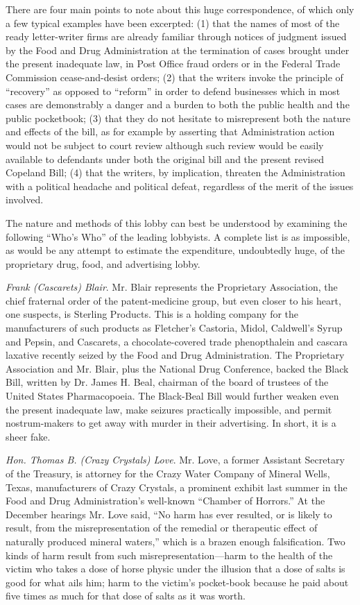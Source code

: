 \documentclass[openany,nobib]{tufte-book}
\begin{document}
There are four main points to note about this huge correspondence, of
which only a few typical examples have been excerpted: (1) that the
names of most of the ready letter-writer firms are already familiar
through notices of judgment issued by the Food and Drug Administration
at the termination of cases brought under the present inadequate law, in
Post Office fraud orders or in the Federal Trade Commission
cease-and-desist orders; (2) that the writers invoke the principle of
``recovery'' as opposed to ``reform'' in order to defend businesses
which in most cases are demonstrably a danger and a burden to both the
public health and the public pocketbook; (3) that they do not hesitate
to misrepresent both the nature and effects of the bill, as for example
by asserting that Administration action would not be subject to court
review although such review would be easily available to defendants
under both the original bill and the present revised Copeland Bill; (4)
that the writers, by implication, threaten the Administration with a
political headache and political defeat, regardless of the merit of the
issues involved.

The nature and methods of this lobby can best be understood by examining
the following ``Who's Who'' of the leading lobbyists. A complete list is
as impossible, as would be any attempt to estimate the expenditure,
undoubtedly huge, of the proprietary drug, food, and advertising lobby.

\emph{Frank (Cascarets) Blair}. Mr. Blair represents the Proprietary
Association, the chief fraternal order of the patent-medicine group, but
even closer to his heart, one suspects, is Sterling Products. This is a
holding company for the manufacturers of such products as Fletcher's
Castoria, Midol, Caldwell's Syrup and Pepsin, and Cascarets, a
chocolate-covered trade phenopthalein and cascara laxative recently
seized by the Food and Drug Administration. The Proprietary Association
and Mr. Blair, plus the National Drug Conference, backed the Black Bill,
written by Dr. James H. Beal, chairman of the board of trustees of the
United States Pharmacopoeia. The Black-Beal Bill would further weaken
even the present inadequate law, make seizures practically impossible,
and permit nostrum-makers to get away with murder in their advertising.
In short, it is a sheer fake.

\emph{Hon. Thomas B. (Crazy Crystals) Love}. Mr. Love, a former
Assistant Secretary of the Treasury, is attorney for the Crazy Water
Company of Mineral Wells, Texas, manufacturers of Crazy Crystals, a
prominent exhibit last summer in the Food and Drug Administration's
well-known ``Chamber of Horrors.'' At the December hearings Mr. Love
said, ``No harm has ever resulted, or is likely to result, from the
misrepresentation of the remedial or therapeutic effect of naturally
produced mineral waters,'' which is a brazen enough falsification. Two
kinds of harm result from such misrepresentation---harm to the health of
the victim who takes a dose of horse physic under the illusion that a
dose of salts is good for what ails him; harm to the victim's
pocket-book because he paid about five times as much for that dose of
salts as it was worth.
\end{document}
